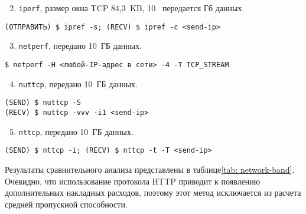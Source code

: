\begin{enumerate}
\setcounter{enumi}{1}
\item \texttt{iperf}, размер окна TCP 84,3 \,KB, 10 \, передается Гб данных.
\end{enumerate}

\noindent
\begin{lstlisting}
(ОТПРАВИТЬ) $ ipref -s; (RECV) $ ipref -c <send-ip>
\end{lstlisting}

\begin{enumerate}
\setcounter{enumi}{2}
\item \texttt{netperf}, передано 10 \,ГБ данных.
\end{enumerate}

\noindent
\begin{lstlisting}
$ netperf -H <любой-IP-адрес в сети> -4 -T TCP_STREAM
\end{lstlisting}

\begin{enumerate}
\setcounter{enumi}{3}
\item \texttt{nuttcp}, передано 10 \,ГБ данных.
\end{enumerate}
\noindent
\begin{lstlisting}
(SEND) $ nuttcp -S
(RECV) $ nuttcp -vvv -i1 <send-ip>
\end{lstlisting}

\begin{enumerate}
\setcounter{enumi}{4}
\item \texttt{nttcp}, передано 10 \,ГБ данных.
\end{enumerate}

\noindent
\begin{lstlisting}
(SEND) $ nttcp -i; (RECV) $ nttcp -t -T <send-ip>
\end{lstlisting}

Результаты сравнительного анализа представлены в таблице\cref{tab: network-band}. Очевидно, что использование протокола HTTP приводит к появлению дополнительных накладных расходов, поэтому этот метод исключается из расчета средней пропускной способности.

